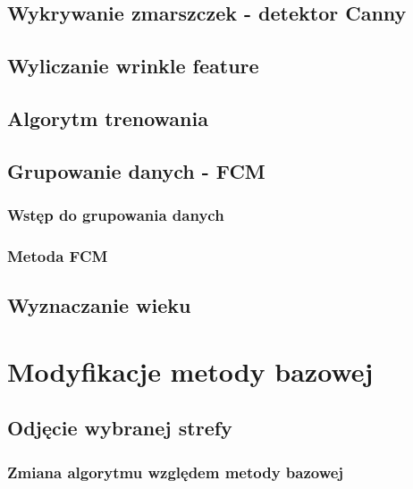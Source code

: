 \documentclass[a4paper,twoside,12pt]{book}
\begin{document}
    \section{Wykrywanie zmarszczek - detektor Canny}\label{sec:wykrywanieZmarszczek}

    \section{Wyliczanie wrinkle feature}\label{sec:wyliczanieWrinkleFeature}

    \section{Algorytm trenowania}\label{sec:algorytmTrenowania}

    \section{Grupowanie danych - FCM}\label{sec:grupowanieDanych}

    \subsection{Wstęp do grupowania danych}
    \subsection{Metoda FCM}

    \section{Wyznaczanie wieku}\label{sec:wyznaczanieWieku}



    \chapter{Modyfikacje metody bazowej}

    \section{Odjęcie wybranej strefy}

    \subsection{Zmiana algorytmu względem metody bazowej}
\end{document}
